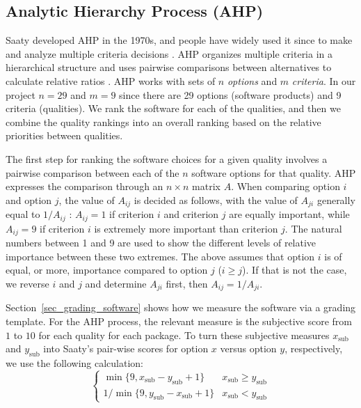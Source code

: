 \documentclass[11pt]{article}
\begin{document}
\subsection{Analytic Hierarchy Process (AHP)} \label{sec_AHP}

Saaty developed AHP in the 1970s, and people have widely used it since to make
and analyze multiple criteria decisions \citep{VaidyaEtAl2006}. AHP organizes
multiple criteria in a hierarchical structure and uses pairwise comparisons
between alternatives to calculate relative ratios \citep{Saaty1990}. AHP works
with sets of $n$ \textit{options} and $m$ \textit{criteria}.  In our project
$n=29$ and $m=9$ since there are 29 options (software products) and 9 criteria
(qualities). We rank the software for each of the qualities, and then we combine
the quality rankings into an overall ranking based on the relative priorities
between qualities.

The first step for ranking the software choices for a given quality involves a
pairwise comparison between each of the $n$ software options for that quality.
AHP expresses the comparison through an $n \times n$ matrix $A$. When comparing
option $i$ and option $j$, the value of $A_{ij}$ is decided as follows, with the
value of $A_{ji}$ generally equal to $1/A_{ij}$ \citep{Saaty1990}: $A_{ij} = 1$
if criterion $i$ and criterion $j$ are equally important, while $A_{ij} = 9$ if
criterion $i$ is extremely more important than criterion $j$.  The natural
numbers between 1 and 9 are used to show the different levels of relative
importance between these two extremes. The above assumes that option $i$ is of
equal, or more, importance compared to option $j$ ($i \geq j$).  If that is not
the case, we reverse $i$ and $j$ and determine $A_{ji}$ first, then $A_{ij} =
1/A_{ji}$.

Section~\ref{sec_grading_software} shows how we measure the software via a
grading template.  For the AHP process, the relevant measure is the subjective
score from $1$ to $10$ for each quality for each package. To turn these
subjective measures $x_{\text{sub}}$ and $y_{\text{sub}}$ into Saaty's
pair-wise scores for option $x$ versus option $y$, respectively, we use the
following calculation:
\[
\begin{cases}
\min\{9, x_{\text{sub}} - y_{\text{sub}} + 1\} & x_{\text{sub}} \geq y_{\text{sub}} \\
1 / \min\{9, y_{\text{sub}} - x_{\text{sub}} + 1\} & x_{\text{sub}} < y_{\text{sub}}
\end{cases}
\]
\end{document}
